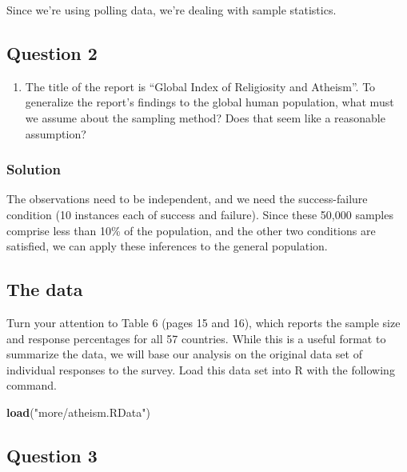 \documentclass[]{article}
\newenvironment{Shaded}{\begin{snugshade}}{\end{snugshade}}
\newcommand{\KeywordTok}[1]{\textcolor[rgb]{0.13,0.29,0.53}{\textbf{#1}}}
\newcommand{\StringTok}[1]{\textcolor[rgb]{0.31,0.60,0.02}{#1}}
\newcommand{\NormalTok}[1]{#1}
\providecommand{\tightlist}{%
  \setlength{\itemsep}{0pt}\setlength{\parskip}{0pt}}
\begin{document}
Since we're using polling data, we're dealing with sample statistics.

\subsection{Question 2}\label{question-2}

\begin{enumerate}
\def\labelenumi{\arabic{enumi}.}
\setcounter{enumi}{1}
\tightlist
\item
  The title of the report is ``Global Index of Religiosity and
  Atheism''. To generalize the report's findings to the global human
  population, what must we assume about the sampling method? Does that
  seem like a reasonable assumption?
\end{enumerate}

\subsubsection{Solution}\label{solution-1}

The observations need to be independent, and we need the success-failure
condition (10 instances each of success and failure). Since these 50,000
samples comprise less than 10\% of the population, and the other two
conditions are satisfied, we can apply these inferences to the general
population.

\subsection{The data}\label{the-data}

Turn your attention to Table 6 (pages 15 and 16), which reports the
sample size and response percentages for all 57 countries. While this is
a useful format to summarize the data, we will base our analysis on the
original data set of individual responses to the survey. Load this data
set into R with the following command.

\begin{Shaded}
\begin{Highlighting}[]
\KeywordTok{load}\NormalTok{(}\StringTok{"more/atheism.RData"}\NormalTok{)}
\end{Highlighting}
\end{Shaded}

\subsection{Question 3}\label{question-3}
\end{document}
